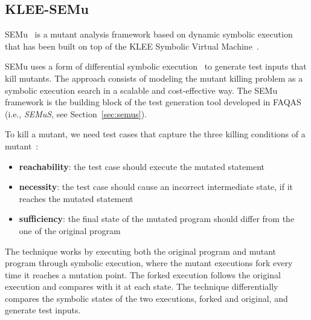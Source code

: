 
\subsection{KLEE-SEMu}
\label{klee-semu}

\STARTCHANGEDWPT

SEMu~\cite{chekam2021killing} is a mutant analysis  framework based on dynamic symbolic execution that has been built on top of the KLEE Symbolic Virtual Machine~\cite{cadar2008klee}.

SEMu uses a form of differential symbolic execution~\cite{} to generate test inputs that kill mutants. The approach consists of modeling the mutant killing problem as a symbolic execution search in a scalable and cost-effective way. 
The SEMu framework is the building block of 
the test generation tool developed in FAQAS (i.e., \emph{SEMuS}, see Section~\ref{sec:semus}).

To kill a mutant, we need test cases that capture the three killing conditions of a mutant~\cite{offutt1997automatically}: 
\begin{itemize}
	\item \textbf{reachability}: the test case should execute the mutated statement
	\item \textbf{necessity}: the test case should cause an incorrect intermediate state, if it reaches the mutated statement
	\item \textbf{sufficiency}: the final state of the mutated program should differ from the one of the original program
\end{itemize}

The technique works by executing both the original program and mutant program through symbolic execution, where the mutant executions fork every time it reaches a mutation point. 
The forked execution follows the original execution and compares with it at each state. 
The technique differentially compares the symbolic states of the two executions, forked and original, and generate test inputs. 

